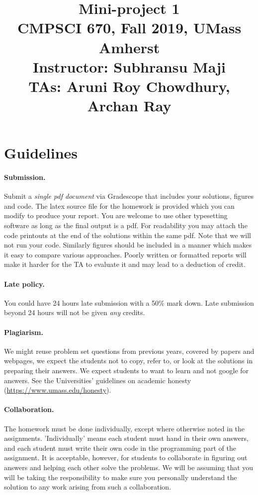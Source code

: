 \documentclass[10pt,letterpaper]{article}
\title{
  \textbf{Mini-project 1} \\
  \Large{CMPSCI 670, Fall 2019, UMass Amherst} \\
  \Large{Instructor: Subhransu Maji} \\
  \Large{TAs: Aruni Roy Chowdhury, Archan Ray}
}
\date{}
\begin{document}
\maketitle

\renewcommand\thesubsection{\thesection.\alph{subsection}}


\section*{Guidelines}

\paragraph{Submission.} Submit a \emph{single pdf document} via Gradescope that includes your solutions, figures and code. The latex source file for the homework is provided which you can modify to produce your report. You are welcome to use other typesetting software as long as the final output is a pdf. For readability you may attach the code printouts at the end of the solutions within the same pdf. Note that we will not run your code. Similarly figures should be included in a manner which makes it easy to compare various approaches. Poorly written or formatted reports will make it harder for the TA to evaluate it and may lead to a deduction of credit. 

\paragraph{Late policy.} You could have 24 hours late submission with a 50\% mark down. Late submission beyond 24 hours will not be given \emph{any} credits. 

\paragraph{Plagiarism.} We might reuse problem set questions from previous years, covered by papers and webpages, we expect the students not to copy, refer to, or look at the solutions in preparing their answers. We expect students to want to learn and not google for answers. See the Universities' guidelines on academic honesty (\url{https://www.umass.edu/honesty}).

\paragraph{Collaboration.} The homework must be done individually, except where otherwise noted in the assignments. 'Individually' means each student must hand in their own answers, and each student must write their own code in the programming part of the assignment. It is acceptable, however, for students to collaborate in figuring out answers and helping each other solve the problems. We will be assuming that you will be taking the responsibility to make sure you personally understand the solution to any work arising from such a collaboration. 
\end{document}
